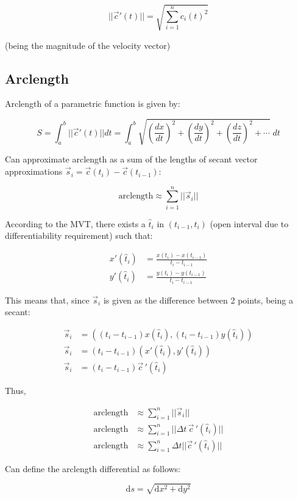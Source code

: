 $$||\vec{c}'(t)||=\sqrt{\displaystyle\sum_{i=1}^{n}c_i(t)^2}$$

(being the magnitude of the velocity vector)

\subsection{Arclength}

Arclength of a parametric function is given by:

\[S=\int_a^b ||\vec{c}'(t)||dt=\int_a^b\sqrt{(\frac{dx}{dt})^2+(\frac{dy}{dt})^2+(\frac{dz}{dt})^2+\cdots}\;dt\]

Can approximate arclength as a sum of the lengths of secant vector approximations
$\vec{s}_i=\vec{c}(t_i)-\vec{c}(t_{i-1})$:

\[\mbox{arclength}\approx\sum_{i=1}^n||\vec{s}_i||\]

According to the MVT, there exists a $\hat{t}_i$ in $(t_{i-1},t_i)$ (open interval due to differentiability requirement) such that:

\begin{align*}
    x'(\hat{t}_i)&=\frac{x(t_i)-x(t_{i-1})}{t_i-t_{i-1}}\\
    y'(\hat{t}_i)&=\frac{y(t_i)-y(t_{i-1})}{t_i-t_{i-1}}
\end{align*}

This means that, since $\vec{s}_i$ is given as the difference between 2 points,
being a secant:

\begin{align*}
    \vec{s}_i&=\left((t_i-t_{i-1})x(\hat{t}_i), (t_i-t_{i-1})y(\hat{t}_i)\right )\\
    \vec{s}_i&=(t_i-t_{i-1})\left(x'(\hat{t}_i),y'(\hat{t}_i)\right)\\
    \vec{s}_i&=(t_i-t_{i-1})\vec{c}\,'(\hat{t}_i)
\end{align*}

Thus,

\begin{align*}
    \mbox{arclength}&\approx\sum_{i=1}^n||\vec{s}_i||\\
    \mbox{arclength}&\approx\sum_{i=1}^n||\Delta t \,\vec{c}\,'(\hat{t}_i)||\\
    \mbox{arclength}&\approx\sum_{i=1}^n\Delta t||\vec{c}\,'(\hat{t}_i)||
\end{align*}

Can define the arclength differential as follows:

\[\mathrm{d}s=\sqrt{\mathrm{d}x^2+\mathrm{d}y^2}\]

